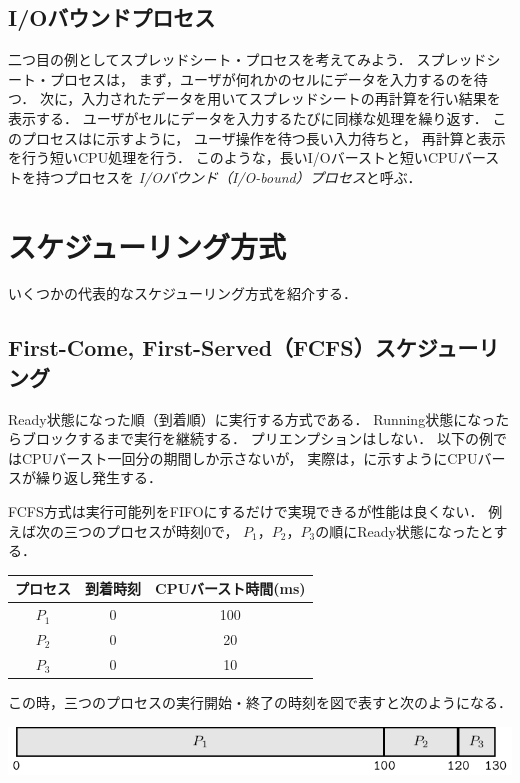\subsection{I/Oバウンドプロセス}
二つ目の例としてスプレッドシート・プロセスを考えてみよう．
スプレッドシート・プロセスは，
まず，ユーザが何れかのセルにデータを入力するのを待つ．
次に，入力されたデータを用いてスプレッドシートの再計算を行い結果を表示する．
ユーザがセルにデータを入力するたびに同様な処理を繰り返す．
このプロセスはに示すように，
ユーザ操作を待つ長い入力待ちと，
再計算と表示を行う短いCPU処理を行う．
このような，長いI/Oバーストと短いCPUバーストを持つプロセスを
\emph{I/Oバウンド（I/O-bound）プロセス}と呼ぶ．

\section{スケジューリング方式}
いくつかの代表的なスケジューリング方式を紹介する．

\subsection{First-Come, First-Served（FCFS）スケジューリング}
Ready状態になった順（到着順）に実行する方式である．
Running状態になったらブロックするまで実行を継続する．
プリエンプションはしない．
以下の例ではCPUバースト一回分の期間しか示さないが，
実際は，に示すようにCPUバースが繰り返し発生する．

FCFS方式は実行可能列をFIFOにするだけで実現できるが性能は良くない．
例えば次の三つのプロセスが時刻0で，
$P_1$，$P_2$，$P_3$の順にReady状態になったとする．

\begin{center}
  \begin{tabular}{c c c}
    プロセス & 到着時刻 & CPUバースト時間(ms) \\
    \hline
    $P_1$    & 0 & 100 \\
    $P_2$    & 0 & 20 \\
    $P_3$    & 0 & 10 \\
  \end{tabular}
\end{center}

この時，三つのプロセスの実行開始・終了の時刻を図で表すと次のようになる．

\begin{center}
  \includegraphics[scale=1.0]{GanntChart/fcfs1.pdf}
\end{center}

